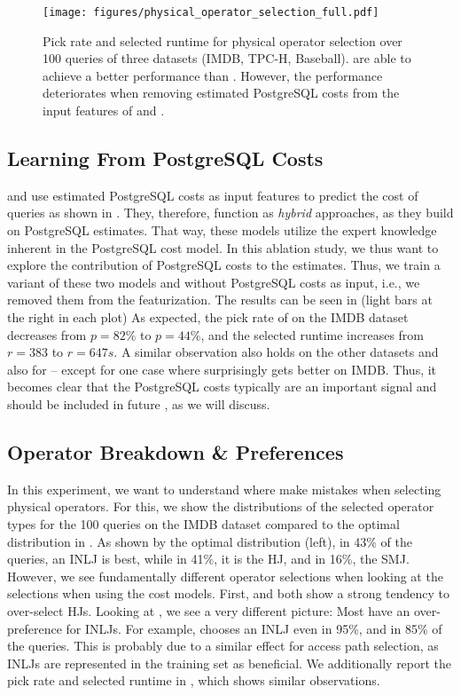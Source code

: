 \begin{figure*}
    \centering
    \texttt{[image: figures/physical\_operator\_selection\_full.pdf]}
    \caption{Pick rate and selected runtime for physical operator selection over 100 queries of three datasets (IMDB, TPC-H, Baseball). \lcms are able to achieve a better performance than \postgres. However, the performance deteriorates when removing estimated PostgreSQL costs from the input features of \dace and \qppnet.}
    \label{fig:physical_operator_selection_full}
\end{figure*}

\subsection{Learning From PostgreSQL Costs}
\dace and \qppnet use estimated PostgreSQL costs as input features to predict the cost of queries as shown in .
They, therefore, function as \textit{hybrid} approaches, as they build on PostgreSQL estimates.
That way, these models utilize the expert knowledge inherent in the PostgreSQL cost model.
In this ablation study, we thus want to explore the contribution of PostgreSQL costs to the estimates.
Thus, we train a variant of these two models \qppnet and \dace without PostgreSQL costs as input, i.e., we removed them from the featurization.
The results can be seen in  (light bars at the right in each plot) 
As expected, the pick rate of \dace on the IMDB dataset decreases from $p=82\%$ to $p=44\%$, and the selected runtime increases from $r=383$ to $r=647s$.
A similar observation also holds on the other datasets and also for \qppnet -- except for one case where surprisingly \qppnet gets better on IMDB.
Thus, it becomes clear that the PostgreSQL costs typically are an important signal and should be included in future \lcms, as we will discuss.
\subsection{Operator Breakdown \& Preferences}
In this experiment, we want to understand where \lcms make mistakes when selecting physical operators.
For this, we show the distributions of the selected operator types for the 100 queries on the IMDB dataset compared to the optimal distribution in .
As shown by the optimal distribution (left), in 43\% of the queries, an INLJ is best, while in 41\%, it is the HJ, and in 16\%, the SMJ.
However, we see fundamentally different operator selections when looking at the selections when using the cost models.
First, \postgresx and \postgresxvi both show a strong tendency to over-select HJs.
Looking at \lcms, we see a very different picture: 
Most \lcms have an over-preference for INLJs.
For example, \queryformer chooses an INLJ even in 95\%, and \zeroshot in 85\% of the queries.
This is probably due to a similar effect for access path selection, as INLJs are represented in the training set as beneficial.
We additionally report the pick rate and selected runtime in , which shows similar observations.
